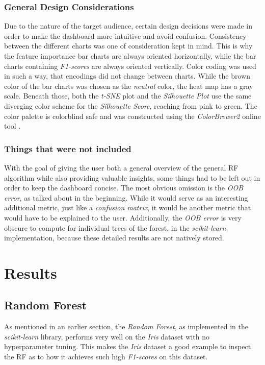 \documentclass[a4paper, 12pt]{article}
\begin{document}
\subsubsection{General Design Considerations}
Due to the nature of the target audience, certain design decisions were made in order to make the
dashboard more intuitive and avoid confusion. Consistency between the different charts was one of
consideration kept in mind. This is why the feature importance bar charts are always oriented
horizontally, while the bar charts containing \textit{F1-scores} are always oriented vertically.
Color coding was used in such a way, that encodings did not change between charts. While the brown
color of the bar charts was chosen as the \textit{neutral} color, the heat map has a gray scale.
Beneath those, both the \textit{t-SNE} plot and the \textit{Silhouette Plot} use the same diverging
color scheme for the \textit{Silhouette Score}, reaching from pink to green. The color palette is
colorblind safe and was constructed using the \textit{ColorBrewer2} \cite{brewer1994guidelines}
online tool \cite{harrower2003colorbrewer}.

\subsubsection{Things that were not included}
With the goal of giving the user both a general overview of the general RF algorithm while also
providing valuable insights, some things had to be left out in order to keep the dashboard concise.
The most obvious omission is the \textit{OOB error}, as talked about in the beginning. While it
would serve as an interesting additional metric, just like a \textit{confusion matrix}, it would
be another metric that would have to be explained to the user. Additionally, the \textit{OOB error}
is very obscure to compute for individual trees of the forest, in the \textit{scikit-learn}
implementation, because these detailed results are not natively stored.

\section{Results}
\subsection{Random Forest}
As mentioned in an earlier section, the \textit{Random Forest}, as implemented in the
\textit{scikit-learn} library, performs very well on the \textit{Iris} dataset with no hyperparameter
tuning. This makes the \textit{Iris} dataset a good example to inspect the RF as to how it achieves
such high \textit{F1-scores} on this dataset. \par
\end{document}
